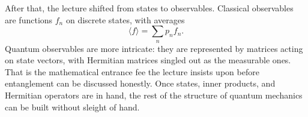 After that, the lecture shifted from states to observables. Classical observables are functions \(f_n\) on discrete states, with averages
\[
\langle f\rangle=\sum_n p_n f_n.
\]
Quantum observables are more intricate: they are represented by matrices acting on state vectors, with Hermitian matrices singled out as the measurable ones. That is the mathematical entrance fee the lecture insists upon before entanglement can be discussed honestly. Once states, inner products, and Hermitian operators are in hand, the rest of the structure of quantum mechanics can be built without sleight of hand.